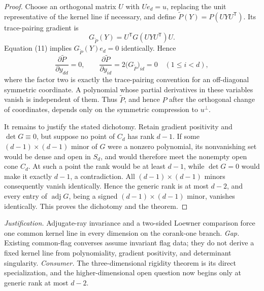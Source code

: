 \documentclass{article}
\begin{document}
\begin{proof}
Choose an orthogonal matrix \(U\) with \(Ue_d=u\), replacing the unit representative of the kernel line if necessary, and define \(\widetilde P(Y)=P(UYU^{\mathsf T})\).  Its trace-pairing gradient is
\[
 G_{\widetilde P}(Y)=U^{\mathsf T}G(UYU^{\mathsf T})U.
\]
Equation (11) implies \(G_{\widetilde P}(Y)e_d=0\) identically.  Hence
\[
 \frac{\partial\widetilde P}{\partial y_{dd}}=0,
 \qquad
 \frac{\partial\widetilde P}{\partial y_{id}}=2\bigl(G_{\widetilde P}\bigr)_{id}=0
 \quad(1\leq i<d), \tag{12}
\]
where the factor two is exactly the trace-pairing convention for an off-diagonal symmetric coordinate.  A polynomial whose partial derivatives in these variables vanish is independent of them.  Thus \(\widetilde P\), and hence \(P\) after the orthogonal change of coordinates, depends only on the symmetric compression to \(u^\perp\).

It remains to justify the stated dichotomy.  Retain gradient positivity and \(\det G\equiv0\), but suppose no point of \(C_d\) has rank \(d-1\).  If some \((d-1)\times(d-1)\) minor of \(G\) were a nonzero polynomial, its nonvanishing set would be dense and open in \(S_d\), and would therefore meet the nonempty open cone \(C_d\).  At such a point the rank would be at least \(d-1\), while \(\det G=0\) would make it exactly \(d-1\), a contradiction.  All \((d-1)\times(d-1)\) minors consequently vanish identically.  Hence the generic rank is at most \(d-2\), and every entry of \(\operatorname{adj}G\), being a signed \((d-1)\times(d-1)\) minor, vanishes identically.  This proves the dichotomy and the theorem.
\end{proof}
\par\smallskip\noindent \textit{Justification.} Adjugate-ray invariance and a two-sided Loewner comparison force one common kernel line in every dimension on the corank-one branch. \textit{Gap.} Existing common-flag converses assume invariant flag data; they do not derive a fixed kernel line from polynomiality, gradient positivity, and determinant singularity. \textit{Consumer.} The three-dimensional rigidity theorem is its direct specialization, and the higher-dimensional open question now begins only at generic rank at most \(d-2\).
\end{document}
